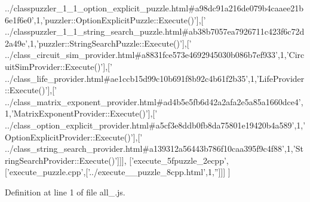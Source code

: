 \begin{DoxyCode}
{      ../classpuzzler\_1\_1\_option\_explicit\_puzzle.html#a98dc91a216de079b4caaee21b6e1f6e0'},1,\textcolor{stringliteral}{'puzzler::OptionExplicitPuzzle::Execute()'}],[\textcolor{stringliteral}{'
      ../classpuzzler\_1\_1\_string\_search\_puzzle.html#ab38b7057ea7926711c423f6c72d2a49e'},1,\textcolor{stringliteral}{'puzzler::StringSearchPuzzle::Execute()'}],[\textcolor{stringliteral}{'
      ../class\_circuit\_sim\_provider.html#a8831fce573e4692945030b086b7ef933'},1,\textcolor{stringliteral}{'CircuitSimProvider::Execute()'}],[\textcolor{stringliteral}{'
      ../class\_life\_provider.html#ae1ccb15d99c10b691f8b92c4b61f2b35'},1,\textcolor{stringliteral}{'LifeProvider::Execute()'}],[\textcolor{stringliteral}{'
      ../class\_matrix\_exponent\_provider.html#ad4b5e5fb6d42a2afa2e5a85a1660dce4'},1,\textcolor{stringliteral}{'MatrixExponentProvider::Execute()'}],[\textcolor{stringliteral}{'
      ../class\_option\_explicit\_provider.html#a5cf3e8ddb0fb8da75801e19420b4a589'},1,\textcolor{stringliteral}{'OptionExplicitProvider::Execute()'}],[\textcolor{stringliteral}{'
      ../class\_string\_search\_provider.html#a139312a56443b786f10caa395f9c4f88'},1,\textcolor{stringliteral}{'StringSearchProvider::Execute()'}]]],
  [\textcolor{stringliteral}{'execute\_5fpuzzle\_2ecpp'},[\textcolor{stringliteral}{'execute\_puzzle.cpp'},[\textcolor{stringliteral}{'../execute\_\_puzzle\_8cpp.html'},1,\textcolor{stringliteral}{''}]]]
]
\end{DoxyCode}


Definition at line 1 of file all\+\_.\+js.

